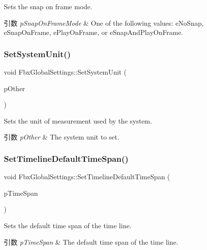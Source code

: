 Sets the snap on frame mode. 
\begin{DoxyParams}{引数}
{\em p\+Snap\+On\+Frame\+Mode} & One of the following values\+: e\+No\+Snap, e\+Snap\+On\+Frame, e\+Play\+On\+Frame, or e\+Snap\+And\+Play\+On\+Frame. \\
\hline
\end{DoxyParams}
\mbox{\label{class_fbx_global_settings_a185096ada8b3c966f6f88d211a438952}} 
\subsubsection{\texorpdfstring{Set\+System\+Unit()}{SetSystemUnit()}}
{\footnotesize\ttfamily void Fbx\+Global\+Settings\+::\+Set\+System\+Unit (\begin{DoxyParamCaption}\item[{const \hyperlink{class_fbx_system_unit}{Fbx\+System\+Unit} \&}]{p\+Other }\end{DoxyParamCaption})}

Sets the unit of measurement used by the system. 
\begin{DoxyParams}{引数}
{\em p\+Other} & The system unit to set. \\
\hline
\end{DoxyParams}
\mbox{\label{class_fbx_global_settings_a5630686adea391bf0dc542380c8d89fe}} 
\subsubsection{\texorpdfstring{Set\+Timeline\+Default\+Time\+Span()}{SetTimelineDefaultTimeSpan()}}
{\footnotesize\ttfamily void Fbx\+Global\+Settings\+::\+Set\+Timeline\+Default\+Time\+Span (\begin{DoxyParamCaption}\item[{const \hyperlink{class_fbx_time_span}{Fbx\+Time\+Span} \&}]{p\+Time\+Span }\end{DoxyParamCaption})}

Sets the default time span of the time line. 
\begin{DoxyParams}{引数}
{\em p\+Time\+Span} & The default time span of the time line. \\
\hline
\end{DoxyParams}
\mbox{\label{class_fbx_global_settings_a7356a58403a96b96f9d4a5d8513dc731}} 
